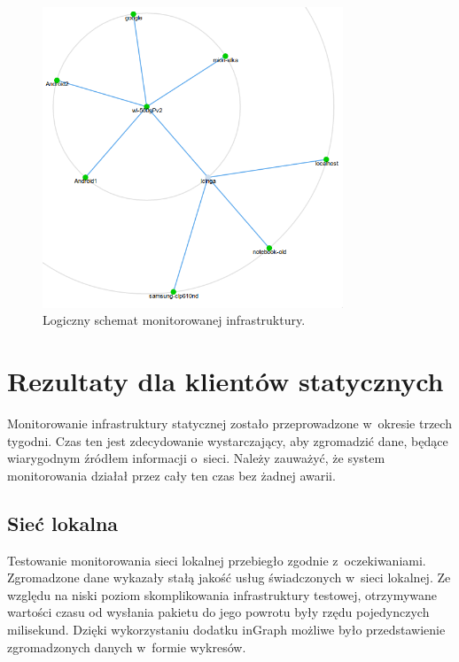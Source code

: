 \begin{figure}[ht]
  \caption{Logiczny schemat monitorowanej
    infrastruktury.}
  \label{fig:logicznySchematSieci}
  \centering
\includegraphics[width=0.8\textwidth]{img/logicznySchematSieci.png}
\end{figure}

\section[Klient statyczny][Rezultaty dla klientów statycznych]{Rezultaty dla klientów statycznych}

Monitorowanie infrastruktury statycznej zostało przeprowadzone
w~okresie trzech tygodni. Czas ten jest zdecydowanie wystarczający, aby
zgromadzić dane, będące wiarygodnym źródłem informacji o~sieci. Należy
zauważyć, że system monitorowania działał przez cały ten czas bez
żadnej awarii.

\subsection[Sieć lokalna][Sieć lokalna]{Sieć lokalna}

Testowanie monitorowania sieci lokalnej przebiegło zgodnie
z~oczekiwaniami. Zgromadzone dane wykazały stałą jakość usług
świadczonych w~sieci lokalnej. Ze względu na niski poziom
skomplikowania infrastruktury testowej, otrzymywane wartości czasu od
wysłania pakietu do jego powrotu były rzędu pojedynczych
milisekund. Dzięki wykorzystaniu dodatku inGraph możliwe było
przedstawienie zgromadzonych danych w~formie wykresów.

